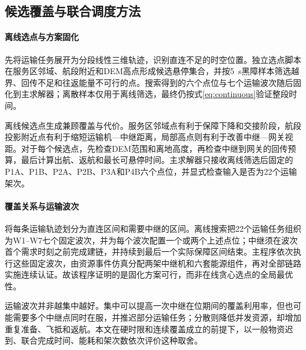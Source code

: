 \subsection{候选覆盖与联合调度方法}
\paragraph{离线选点与方案固化}
先将运输任务展开为分段线性三维轨迹，识别直连不足的时空位置。独立选点脚本在服务区邻域、航段附近和DEM高点形成候选悬停集合，并按5~s黑障样本筛选越界、回传不足和往返能量不可行的点。搜索得到的六个点位与七个运输波次随后固化到主求解器；离散样本仅用于离线筛选，最终仍按式\eqref{eq:continuous}验证整段时间。

离线候选点生成兼顾覆盖与代价。服务区邻域点有利于保障下降和交接阶段，航段投影附近点有利于缩短运输机—中继距离，局部高点则有利于改善中继—网关视距。对于每个候选点，先检查DEM范围和离地高度，再检查中继到网关的回传预算，最后计算出航、返航和最长可悬停时间。主求解器只接收离线筛选后固定的P1A、P1B、P2A、P2B、P3A和P4B六个点位，并显式检查输入是否为22个运输架次。

\paragraph{覆盖关系与运输波次}
将每条运输轨迹划分为直连区间和需要中继的区间。离线搜索把22个运输任务组织为W1--W7七个固定波次，并为每个波次配置一个或两个上述点位；中继须在波次首个需求时刻之前完成建链，并持续到最后一个实际保障区间结束。主程序依次执行这些固定波次，由资源事件仿真分配两架中继机和六套能源组件，再对全部链路实施连续认证。故该程序证明的是固化方案可行，而非在线贪心选点的全局最优性。

运输波次并非越集中越好。集中可以提高一次中继在位期间的覆盖利用率，但也可能需要多个中继点同时在服，并推迟部分运输任务；分散则降低并发资源，却增加重复准备、飞抵和返航。本文在硬时限和连续覆盖成立的前提下，以一般物资迟到、联合完成时间、能耗和架次数依次评价这种取舍。

